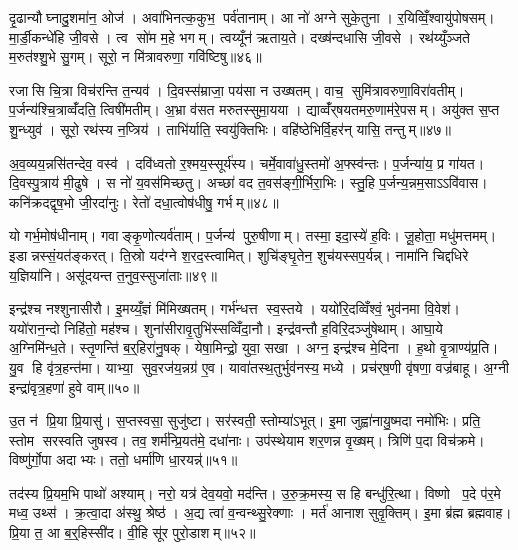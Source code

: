 दृ॒ढान्यौघ्नादु॒शमा॑न॒ ओज॑। अवा॑भिनत्क॒कुभ॒ पर्व॑तानाम्। आ नो॑ अग्ने सुके॒तुना। र॒यिव्विँ॒श्वायु॑पोषसम्। मा॒र्डी॒कन्धे॑हि जी॒वसे। त्व सो॑म म॒हे भगम्। त्वय्यूँन॑ ऋताय॒ते। दख्ष॑न्दधासि जी॒वसे। रथ॑य्युँञ्जते म॒रुत॑श्शु॒भे सु॒गम्। सूरो॒ न मि॑त्रावरुणा॒ गवि॑ष्टिषु॥४६॥

रजासि चि॒त्रा विच॑रन्ति त॒न्यव॑। दि॒वस्स॑म्राजा॒ पय॑सा न उख्षतम्। वाच॒ सुमि॑त्रावरुणा॒विरा॑वतीम्। प॒र्जन्य॑श्चि॒त्राव्वँ॑दति॒ त्विषी॑मतीम्। अ॒भ्रा व॑सत मरुतस्सुमा॒यया। द्याव्वँ॑र्‌षयतमरु॒णाम॑रे॒पसम्। अयु॑क्त स॒प्त शु॒न्ध्युव॑। सूरो॒ रथ॑स्य न॒प्त्रिय॑। ताभि॑र्याति॒ स्वयु॑क्तिभिः। वहि॑ष्ठेभिर्\mbox{}वि॒हर॑न् यासि॒ तन्तुम्॥४७॥

अ॒व॒व्यय॒न्नसि॑तन्देव॒ वस्व॑। दवि॑ध्वतो र॒श्मय॒स्सूर्य॑स्य। चर्मे॒वावा॑धु॒स्तमो॑ अ॒फ्स्व॑न्तः। प॒र्जन्या॑य॒ प्र गा॑यत। दि॒वस्पु॒त्राय॑ मी॒ढुषे। स नो॑ य॒वस॑मिच्छतु। अच्छा॑ वद त॒वस॑ङ्गी॒र्भिरा॒भिः। स्तु॒हि प॒र्जन्य॒न्नम॒साऽऽवि॑वास। कनि॑क्रदद्वृष॒भो जी॒रदा॑नुः। रेतो॑ दधा॒त्वोष॑धीषु॒ गर्भम्॥४८॥

यो गर्भ॒मोष॑धीनाम्। गवाङ्कृ॒णोत्यर्व॑ताम्। प॒र्जन्य॑ पुरु॒षीणाम्। तस्मा॒ इदा॒स्ये॑ ह॒विः। जू॒होता॒ मधु॑मत्तमम्। इडान्नस्सं॒यत॑ङ्करत्। ति॒स्रो यद॑ग्ने श॒रद॒स्त्वामित्। शुचि॑ङ्घृ॒तेन॒ शुच॑यस्सप॒र्यन्न्। नामा॑नि चिद्दधिरे य॒ज्ञिया॑नि। असू॑दयन्त त॒नुव॒स्सुजा॑ताः॥४९॥

इन्द्र॑श्च नश्शुनासीरौ। इ॒मय्यँ॒ज्ञं मि॑मिख्षतम्। गर्भ॑न्धत्त स्व॒स्तये। ययो॑रि॒दव्विँश्वं॒ भुव॑नमा वि॒वेश॑। ययो॑रान॒न्दो निहि॑तो॒ मह॑श्च। शुना॑सीरावृ॒तुभि॑स्सव्विँदा॒नौ। इन्द्र॑वन्तौ ह॒विरि॒दञ्जु॑षेथाम्। आघा॒ये अ॒ग्निमि॑न्ध॒ते। स्तृ॒णन्ति॑ ब॒र्॒हिरा॑नु॒षक्। येषा॒मिन्द्रो॒ युवा॒ सखा। अग्न॒ इन्द्र॑श्च मे॒दिना। ह॒थो वृ॒त्राण्य॑प्र॒ति। यु॒व हि वृ॑त्र॒हन्त॑मा। याभ्या॒ सुव॒रज॑य॒न्नग्र॑ ए॒व। यावा॑तस्थ॒तुर्भुव॑नस्य॒ मध्ये। प्रच॑र्‌ष॒णी वृ॑षणा॒ वज्र॑बाहू। अ॒ग्नी इन्द्रा॑वृत्र॒हणा॑ हुवे वाम्॥५०॥\anuvakamend[मन॒ इन्द्रो॒ गवि॑ष्टिषु॒ तन्तु॒ङ्गर्भ॒ सुजा॑ता॒स्सखा॑ स॒प्त च॑]

उ॒त न॑ प्रि॒या प्रि॒यासु॑। स॒प्तस्वसा॒ सुजु॑ष्टा। सर॑स्वती॒ स्तोम्या॑ऽभूत्। इ॒मा जुह्वा॑नायु॒ष्मदा नमो॑भिः। प्रति॒ स्तोम सरस्वति जुषस्व। तव॒ शर्म॑न्प्रि॒यत॑मे॒ दधा॑नाः। उप॑स्थेयाम शर॒णन्न वृ॒ख्षम्। त्रिणि॑ प॒दा विच॑क्रमे। विष्णु॑र्गो॒पा अदाभ्यः। ततो॒ धर्मा॑णि धा॒रयन्न्॑॥५१॥

तद॑स्य प्रि॒यम॒भि पाथो॑ अश्याम्। नरो॒ यत्र॑ देव॒यवो॒ मद॑न्ति। उ॒रु॒क्र॒मस्य॒ स हि बन्धु॑रि॒त्था। विष्णो प॒दे प॑र॒मे मध्व॒ उथ्स॑। क्र॒त्वा॒दा अ॑स्थु॒ श्रेष्ठ॑। अ॒द्य त्वा॑ व॒न्वन्थ्सु॒रेक्णाः। मर्त॑ आनाश सुवृ॒क्तिम्। इ॒मा ब्र॑ह्म ब्रह्मवाह। प्रि॒या त॒ आ ब॒र्॒हिस्सी॑द। वी॒हि सू॑र पुरो॒डाशम्॥५२॥

